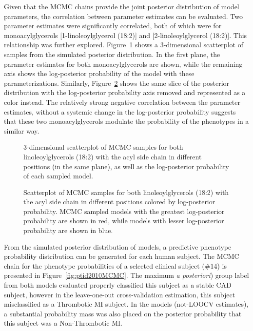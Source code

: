 \begin{DoubleSpace*}
Given that the MCMC chains provide the joint posterior distribution of model parameters, the correlation between parameter estimates can be evaluated. Two parameter estimates were significantly correlated, both of which were for monoacylglycerols [1-linoleoylglycerol (18:2)] and [2-linoleoylglycerol (18:2)]. This relationship was further explored. Figure~\ref{fig:coefPost} shows a 3-dimensional scatterplot of samples from the simulated posterior distribution. In the first plane, the parameter estimates for both monoacylglycerols are shown, while the remaining axis shows the log-posterior probability of the model with these parameterizations.  Similarly, Figure~\ref{fig:coefPost2} shows the same slice of the posterior distribution with the log-posterior probability axis removed and represented as a color instead. The relatively strong negative correlation between the parameter estimates, without a systemic change in the log-posterior probability suggests that these two monoacylglycerols modulate the probability of the phenotypes in a similar way. 

\begin{figure}[H]
	\caption[3-dimensional scatterplot of MCMC samples for both linoleoylglycerols (18:2) with the acyl side chain in different positions and the log-posterior probability of each sampled model]{3-dimensional scatterplot of MCMC samples for both linoleoylglycerols (18:2) with the acyl side chain in different positions (in the same plane), as well as the log-posterior probability of each sampled model. \label{fig:coefPost} }
\end{figure}

\begin{figure}[H]
	\caption[Scatterplot of MCMC samples for both linoleoylglycerols (18:2) with the acyl side chain in different positions colored by log-posterior probability]{Scatterplot of MCMC samples for both linoleoylglycerols (18:2) with the acyl side chain in different positions colored by log-posterior probability. MCMC sampled models with the greatest log-posterior probability are shown in red, while models with lesser log-posterior probability are shown in blue. \label{fig:coefPost2} }
\end{figure}

From the simulated posterior distribution of models, a predictive phenotype probability distribution can be generated for each human subject. The MCMC chain for the phenotype probabilities of a selected clinical subject (\#14) is presented in Figure~\ref{fig:ptid2010MCMC}. The maximum \emph{a posteriori}) group label from both models evaluated properly classified this subject as a stable CAD subject, however in the leave-one-out cross-validation estimation, this subject misclassified as a Thrombotic MI subject. In the models (not-LOOCV estimates), a substantial probability mass was also placed on the posterior probability that this subject was a Non-Thrombotic MI.  


\end{DoubleSpace*}
